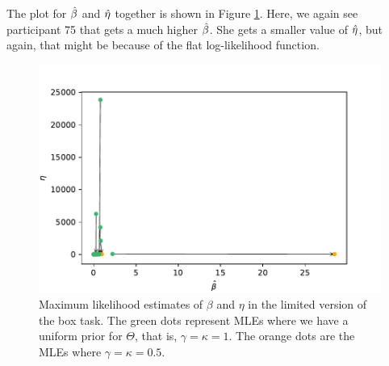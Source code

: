 The plot for $\hat{\beta}$ and $\hat{\eta}$ together is shown in Figure \ref{fig:sensitivity_mles_lim_b_e}. Here, we again see participant 75 that gets a much higher $\hat{\beta}$. She gets a smaller value of $\hat{\eta}$, but again, that might be because of the flat log-likelihood function. 
\begin{figure}
    \centering
    \includegraphics[scale=0.7]{pictures/Sensitivity/mles_lim_b_e.pdf}
    \caption[MLEs of $\beta$ and $\eta$ for prior with $\gamma=\kappa=1$ and $\gamma=\kappa=0.5$, limited]{
    Maximum likelihood estimates of $\beta$ and $\eta$ in the limited version of the box task. The green dots represent MLEs where we have a uniform prior for $\Theta$, that is, $\gamma=\kappa=1$. The orange dots are the MLEs where $\gamma=\kappa=0.5$.}
    \label{fig:sensitivity_mles_lim_b_e}
\end{figure}

